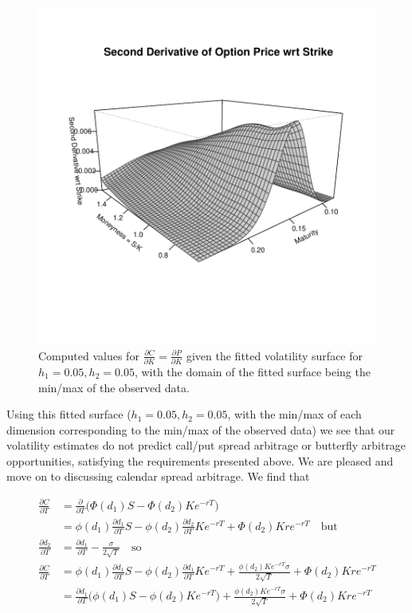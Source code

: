 \documentclass[11pt]{article}
\newlength\tindent
\renewcommand{\indent}{\hspace*{\tindent}}
\begin{document}
\begin{figure}[H]
	\centering
 	\includegraphics[scale=0.65]{../plots/q3/strike_gamma.pdf}
\caption{Computed values for $\frac{\partial C}{\partial K} = \frac{\partial P}{\partial K}$ given the fitted volatility surface for $h_1 = 0.05, h_2 = 0.05$, with the domain of the fitted surface being the min/max of the observed data.}
\label{fig:strike_gamma}
\end{figure}

\indent Using this fitted surface ($h_1 = 0.05, h_2 = 0.05$, with the min/max of each dimension corresponding to the min/max of the observed data) we see that our volatility estimates do not predict call/put spread arbitrage or butterfly arbitrage opportunities, satisfying the requirements presented above. We are pleased and move on to discussing calendar spread arbitrage. We find that

\begin{align*}
	\frac{\partial C}{\partial T} &= \frac{\partial}{\partial T}\bigg(\Phi(d_1)S - \Phi(d_2)Ke^{-rT} \bigg) \\
	&= \phi(d_1)\frac{\partial d_1}{\partial T}S - \phi(d_2)\frac{\partial d_2}{\partial T}Ke^{-rT} + \Phi(d_2)Kre^{-rT} \quad \text{but} \\
	\frac{\partial d_2}{\partial T} &= \frac{\partial d_1}{\partial T} - \frac{\sigma}{2\sqrt{T}} \quad \text{so} \\
	\frac{\partial C}{\partial T} &= \phi(d_1)\frac{\partial d_1}{\partial T}S - \phi(d_2)\frac{\partial d_1}{\partial T}Ke^{-rT} + \frac{\phi(d_2)Ke^{-rT}\sigma}{2\sqrt{T}} + \Phi(d_2)Kre^{-rT} \\
	&= \frac{\partial d_1}{\partial T}\bigg(\phi(d_1)S - \phi(d_2)Ke^{-rT}\bigg) + \frac{\phi(d_2)Ke^{-rT}\sigma}{2\sqrt{T}} + \Phi(d_2)Kre^{-rT} 
\end{align*}
\end{document}
